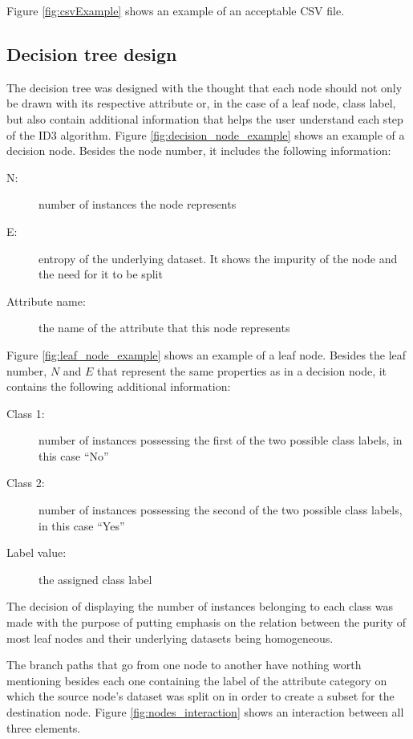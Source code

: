 Figure \ref{fig:csvExample} shows an example of an acceptable CSV file.

\subsection{Decision tree design}
The decision tree was designed with the thought that each node should not only be drawn with its respective attribute or, in the case of a leaf node, class label, but also contain additional information that helps the user understand each step of the ID3 algorithm.
Figure \ref{fig:decision_node_example} shows an example of a decision node.
Besides the node number, it includes the following information:
\begin{description}
    \item[N:] number of instances the node represents
    \item[E:] entropy of the underlying dataset. It shows the impurity of the node and the need for it to be split
    \item[Attribute name:] the name of the attribute that this node represents
\end{description}

Figure \ref{fig:leaf_node_example} shows an example of a leaf node.
Besides the leaf number, $N$ and $E$ that represent the same properties as in a decision node, it contains the following additional information:
\begin{description}
    \item[Class 1:] number of instances possessing the first of the two possible class labels, in this case ``No''
    \item[Class 2:] number of instances possessing the second of the two possible class labels, in this case ``Yes''
    \item[Label value:] the assigned class label
\end{description}
The decision of displaying the number of instances belonging to each class was made with the purpose of putting emphasis on the relation between the purity of most leaf nodes and their underlying datasets being homogeneous.

The branch paths that go from one node to another have nothing worth mentioning besides each one containing the label of the attribute category on which the source node's dataset was split on in order to create a subset for the destination node.
Figure \ref{fig:nodes_interaction} shows an interaction between all three elements.


